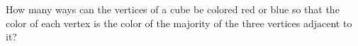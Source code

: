 How many ways can the vertices of a cube be colored red or blue so that the color of each vertex is the color of the majority of the three vertices adjacent to it?

